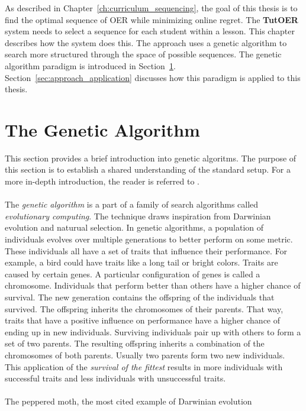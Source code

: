 As described in Chapter~\ref{ch:curriculum_sequencing}, the goal of this thesis
is to find the optimal sequence of OER while minimizing online regret. The
\textbf{TutOER} system needs to select a sequence for each student within a
lesson. This chapter describes how the system does this. The approach uses a
genetic algorithm to search more structured through the space of possible
sequences. The genetic algorithm paradigm is introduced in
Section~\ref{sec:approach_intro}. Section~\ref{sec:approach_application}
discusses how this paradigm is applied to this thesis.

\section{The Genetic Algorithm}
\label{sec:approach_intro}
This section provides a brief introduction into genetic algoritms. The purpose
of this section is to establish a shared understanding of the standard setup. For a more
in-depth introduction, the reader is referred to \citep{Eiben2007}.\\\\
\noindent
The \emph{genetic algorithm} \citep{Holland1992} is a part of a family of
search algorithms called \emph{evolutionary computing}. The technique draws
inspiration from Darwinian evolution and naturual selection. In genetic
algorithms, a population of individuals evolves over multiple generations to
better perform on some metric. These individuals all have a set of traits that
influence their performance. For example, a bird could have traits like a long
tail or bright colors. Traits are caused by certain genes. A particular
configuration of genes is called a chromosome. Individuals that perform better
than others have a higher chance of survival. The new generation contains the
offspring of the individuals that survived. The offspring inherits the
chromosomes of their parents. That way, traits that have a positive influence
on performance have a higher chance of ending up in new individuals. Surviving
individuals pair up with others to form a set of two parents. The resulting
offspring inherits a combination of the chromosomes of both parents. Usually
two parents form two new individuals. This application of the \emph{survival of
the fittest} results in more individuals with successful traits and less
individuals with unsuccessful traits.\\\\
\noindent
The peppered moth, the most cited example of Darwinian evolution
